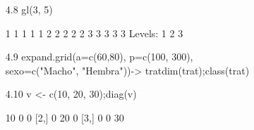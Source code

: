 \documentclass[letterpaper, 12pt]{article}
\begin{document}
\begin{enumerate}
\begin{enumerate}
\item[4.8] gl(3, 5)
\begin{Schunk}
\begin{Soutput}
 [1] 1 1 1 1 1 2 2 2 2 2 3 3 3 3 3
Levels: 1 2 3
\end{Soutput}
\end{Schunk}

\item[4.9] expand.grid(a=c(60,80), p=c(100, 300),\\
sexo=c("Macho", "Hembra"))-> tratdim(trat);class(trat)
\item[4.10] v <- c(10, 20, 30);diag(v)
\begin{Schunk}
\begin{Soutput}
     [,1] [,2] [,3]
[1,]   10    0    0
[2,]    0   20    0
[3,]    0    0   30
\end{Soutput}
\end{Schunk}

\end{enumerate}
\end{enumerate}
\end{document}
